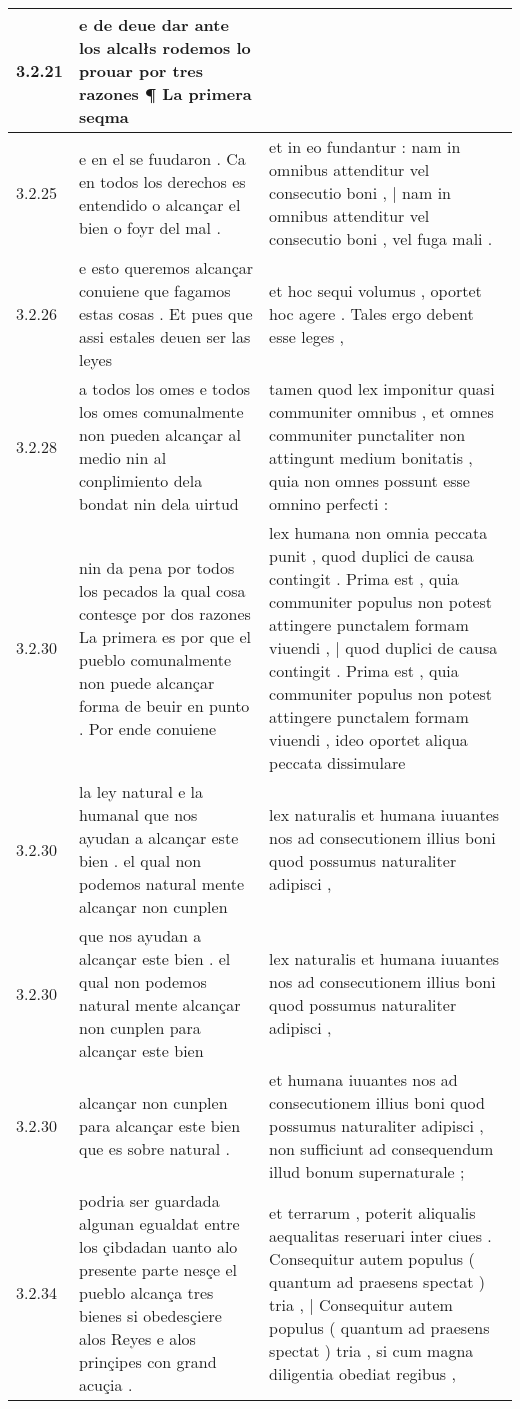 \begin{tabular}{|p{1cm}|p{6.5cm}|p{6.5cm}|}
3.2.21 & e de deue dar ante los alcalłs rodemos lo prouar por tres razones ¶ La primera seqma &  \\\hline
3.2.25 & e en el se fuudaron . Ca en todos los derechos es entendido o alcançar el bien o foyr del mal . & et in eo fundantur : nam in omnibus attenditur vel consecutio boni , | nam in omnibus attenditur vel consecutio boni , vel fuga mali . \\\hline
3.2.26 & e esto queremos alcançar conuiene que fagamos estas cosas . Et pues que assi estales deuen ser las leyes & et hoc sequi volumus , oportet hoc agere . Tales ergo debent esse leges , \\\hline
3.2.28 & a todos los omes e todos los omes comunalmente non pueden alcançar al medio nin al conplimiento dela bondat nin dela uirtud & tamen quod lex imponitur quasi communiter omnibus , et omnes communiter punctaliter non attingunt medium bonitatis , quia non omnes possunt esse omnino perfecti : \\\hline
3.2.30 & nin da pena por todos los pecados la qual cosa contesçe por dos razones La primera es por que el pueblo comunalmente non puede alcançar forma de beuir en punto . Por ende conuiene & lex humana non omnia peccata punit , quod duplici de causa contingit . Prima est , quia communiter populus non potest attingere punctalem formam viuendi , | quod duplici de causa contingit . Prima est , quia communiter populus non potest attingere punctalem formam viuendi , ideo oportet aliqua peccata dissimulare \\\hline
3.2.30 & la ley natural e la humanal que nos ayudan a alcançar este bien . el qual non podemos natural mente alcançar non cunplen & lex naturalis et humana iuuantes nos ad consecutionem illius boni quod possumus naturaliter adipisci , \\\hline
3.2.30 & que nos ayudan a alcançar este bien . el qual non podemos natural mente alcançar non cunplen para alcançar este bien & lex naturalis et humana iuuantes nos ad consecutionem illius boni quod possumus naturaliter adipisci , \\\hline
3.2.30 & alcançar non cunplen para alcançar este bien que es sobre natural . & et humana iuuantes nos ad consecutionem illius boni quod possumus naturaliter adipisci , non sufficiunt ad consequendum illud bonum supernaturale ; \\\hline
3.2.34 & podria ser guardada algunan egualdat entre los çibdadan uanto alo presente parte nesçe el pueblo alcança tres bienes si obedesçiere alos Reyes e alos prinçipes con grand acuçia . & et terrarum , poterit aliqualis aequalitas reseruari inter ciues . Consequitur autem populus ( quantum ad praesens spectat ) tria , | Consequitur autem populus ( quantum ad praesens spectat ) tria , si cum magna diligentia obediat regibus , \\\hline

\end{tabular}
